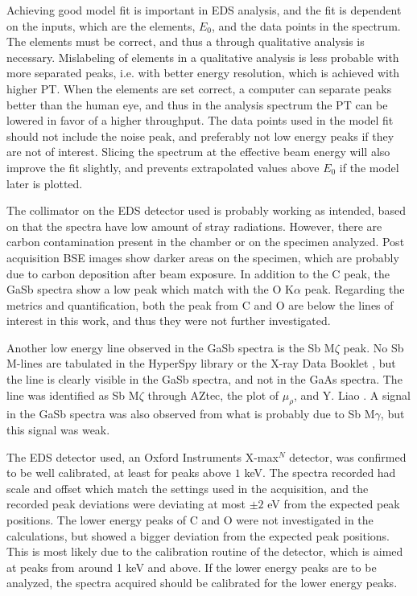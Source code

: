 Achieving good model fit is important in EDS analysis, and the fit is dependent on the inputs, which are the elements, $E_0$, and the data points in the spectrum.
The elements must be correct, and thus a through qualitative analysis is necessary.
Mislabeling of elements in a qualitative analysis is less probable with more separated peaks, i.e. with better energy resolution, which is achieved with higher PT.
When the elements are set correct, a computer can separate peaks better than the human eye, and thus in the analysis spectrum the PT can be lowered in favor of a higher throughput.
The data points used in the model fit should not include the noise peak, and preferably not low energy peaks if they are not of interest.
Slicing the spectrum at the effective beam energy will also improve the fit slightly, and prevents extrapolated values above $E_0$ if the model later is plotted.



The collimator on the EDS detector used is probably working as intended, based on that the spectra have low amount of stray radiations.
However, there are carbon contamination present in the chamber or on the specimen analyzed.
Post acquisition BSE images show darker areas on the specimen, which are probably due to carbon deposition after beam exposure.
In addition to the C peak, the GaSb spectra show a low peak which match with the O K$\alpha$ peak.
Regarding the metrics and quantification, both the peak from C and O are below the lines of interest in this work, and thus they were not further investigated.

Another low energy line observed in the GaSb spectra is the Sb M$\zeta$ peak.
No Sb M-lines are tabulated in the HyperSpy library \cite{hyperspy_1.7.1} or the X-ray Data Booklet \cite{thompson_x-ray_2004}, but the line is clearly visible in the GaSb spectra, and not in the GaAs spectra.
The line was identified as Sb M$\zeta$ through AZtec, the plot of $\mu_\rho$, and Y. Liao \cite{liao2006practical}.
A signal in the GaSb spectra was also observed from what is probably due to Sb M$\gamma$, but this signal was weak.

The EDS detector used, an Oxford Instruments X-max$^N$ detector, was confirmed to be well calibrated, at least for peaks above $1$ keV.
The spectra recorded had scale and offset which match the settings used in the acquisition, and the recorded peak deviations were deviating at most $\pm 2$ eV from the expected peak positions.
The lower energy peaks of C and O were not investigated in the calculations, but showed a bigger deviation from the expected peak positions.
This is most likely due to the calibration routine of the detector, which is aimed at peaks from around 1 keV and above.
If the lower energy peaks are to be analyzed, the spectra acquired should be calibrated for the lower energy peaks.



